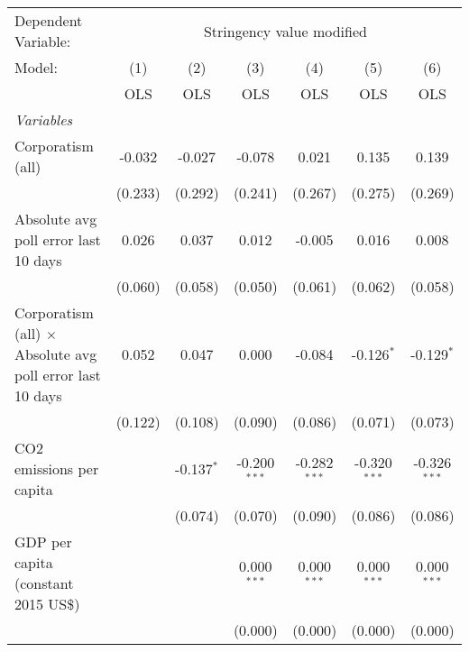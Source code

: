 
\begingroup
\centering
\begin{tabular}{lcccccc}
   \toprule
   Dependent Variable: & \multicolumn{6}{c}{Stringency value modified}\\
   Model:                                                           & (1)     & (2)          & (3)            & (4)            & (5)            & (6)\\  
                                                                    &  OLS    & OLS          & OLS            & OLS            & OLS            & OLS\\  
   \midrule
   \emph{Variables}\\
   Corporatism (all)                                                & -0.032  & -0.027       & -0.078         & 0.021          & 0.135          & 0.139\\   
                                                                    & (0.233) & (0.292)      & (0.241)        & (0.267)        & (0.275)        & (0.269)\\   
   Absolute avg poll error last 10 days                             & 0.026   & 0.037        & 0.012          & -0.005         & 0.016          & 0.008\\   
                                                                    & (0.060) & (0.058)      & (0.050)        & (0.061)        & (0.062)        & (0.058)\\   
   Corporatism (all) $\times$ Absolute avg poll error last 10 days  & 0.052   & 0.047        & 0.000          & -0.084         & -0.126$^{*}$   & -0.129$^{*}$\\   
                                                                    & (0.122) & (0.108)      & (0.090)        & (0.086)        & (0.071)        & (0.073)\\   
   CO2 emissions per capita                                         &         & -0.137$^{*}$ & -0.200$^{***}$ & -0.282$^{***}$ & -0.320$^{***}$ & -0.326$^{***}$\\   
                                                                    &         & (0.074)      & (0.070)        & (0.090)        & (0.086)        & (0.086)\\   
   GDP per capita (constant 2015 US\$)                              &         &              & 0.000$^{***}$  & 0.000$^{***}$  & 0.000$^{***}$  & 0.000$^{***}$\\   
                                                                    &         &              & (0.000)        & (0.000)        & (0.000)        & (0.000)\\   

\end{tabular}
